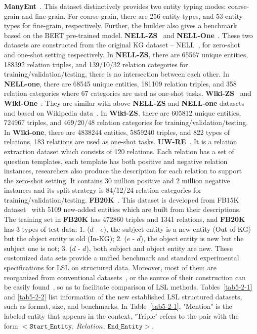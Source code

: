 \textbf{ManyEnt}~. This dataset distinctively provides two entity typing modes: coarse-grain and fine-grain. For coarse-grain, there are 256 entity types, and 53 entity types for fine-grain, respectively. Further, the builder also gives a benchmark based on the BERT pre-trained model.
\textbf{NELL-ZS}~ and \textbf{NELL-One}~. These two datasets are constructed from the original KG dataset -- NELL~, for zero-shot and one-shot setting respectively. In \textbf{NELL-ZS}, there are 65567 unique entities, 188392 relation triples, and 139/10/32 relation categories for training/validation/testing, there is no intersection between each other. In \textbf{NELL-one}, there are 68545 unique entities, 181109 relation triples, and 358 relation categories where 67 categories are used as one-shot tasks.
\textbf{Wiki-ZS}~ and \textbf{Wiki-One}~. They are similar with above \textbf{NELL-ZS} and \textbf{NELL-one} datasets and based on Wikipedia data~. In \textbf{Wiki-ZS}, there are 605812 unique entities, 724967 triples, and 469/20/48 relation categories for training/validation/testing. In \textbf{Wiki-one}, there are 4838244 entities, 5859240 triples, and 822 types of relations, 183 relations are used as one-shot tasks.
\textbf{UW-RE}~. It is a relation extraction dataset which consists of 120 relations. Each relation has a set of question templates, each template has both positive and negative relation instances, researchers also produce the description for each relation to support the zero-shot setting. It contains 30 million positive and 2 million negative instances and its split strategy is 84/12/24 relation categories for training/validation/testing.
\textbf{FB20K}~. This dataset is developed from FB15K dataset~ with 5109 new-added entities which are  built from their descriptions. The training set in \textbf{FB20K} has 472860 triples and 1341 relations, and \textbf{FB20K} has 3 types of test data: 1. ($d$ - $e$), the subject entity is a new entity (Out-of-KG) but the object entity is old (In-KG); 2. ($e$ - $d$), the object entity is new but the subject one is not; 3. ($d$ - $d$), both subject and object entity are new.
These customized data sets provide a unified benchmark and standard experimental specifications for LSL on structured data. Moreover, most of them are reorganized from conventional datasets~, or the source of their construction can be easily found~, so as to facilitate comparison of LSL methods. Tables~\ref{tab5-2-1} and \ref{tab5-2-2} list information of the new established LSL structured datasets, such as format, size, and benchmarks. In Table~\ref{tab5-2-1}, "Mention" is the labeled entity that appears in the context, "Triple" refers to the pair with the form $< \texttt{Start\_Entity}, \  \textit{Relation}, \  \texttt{End\_Entity} >$.

